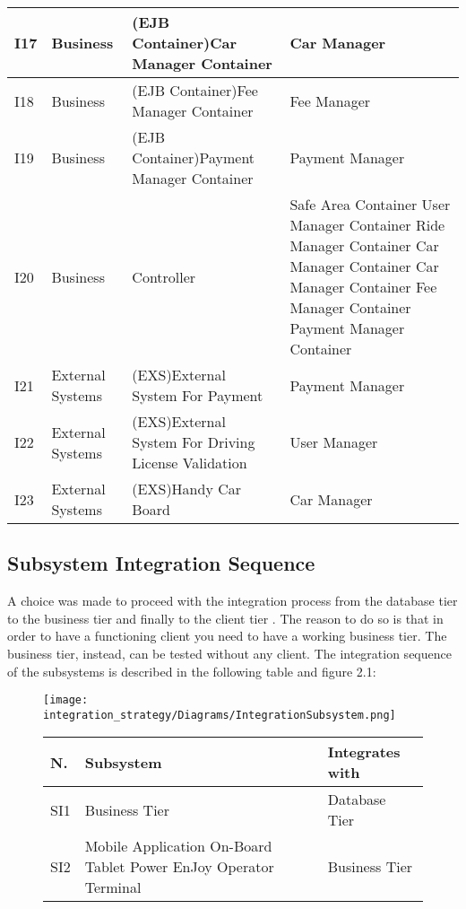 \begin{longtable}{| m{1cm}| m{} | m{4cm} | m{} | }
\hline
I17 & Business & (EJB Container)Car Manager Container & Car Manager\\
\hline
I18 & Business & (EJB Container)Fee Manager Container & Fee Manager\\
\hline
I19 & Business & (EJB Container)Payment Manager Container & Payment Manager\\
\hline
I20 & Business & Controller & Safe Area Container \newline User Manager Container \newline Ride Manager Container \newline Car Manager Container \newline Car Manager Container \newline Fee Manager Container \newline Payment Manager Container\\
\hline
I21 & External Systems & (EXS)External System For Payment & Payment Manager\\
\hline
I22 & External Systems & (EXS)External System For Driving License Validation & User Manager\\
\hline
I23 & External Systems & (EXS)Handy Car Board & Car Manager\\
\hline
\end{longtable}

\subsection{Subsystem Integration Sequence}
A choice was made to proceed with the integration process from the database tier to the business tier and finally to the client tier . The reason to do so is that in order to have a functioning client you need to have a working business tier. The business tier, instead, can be tested without any client. 
The integration sequence of the subsystems is described in the following table and figure 2.1:
\begin{figure}
	\centering
	\texttt{[image: integration\_strategy/Diagrams/IntegrationSubsystem.png]}
	\caption{Order of integration of the subsystems.}
	\label{fig:subsystems}
		
\begin{longtable}{| m{1cm}| m{4cm}| m{4cm} | }
\hline
\textbf{N.} & \textbf{Subsystem} & \textbf{Integrates with}\\
\hline
SI1 & Business Tier & Database Tier\\
\hline
SI2 & Mobile Application \newline On-Board Tablet \newline Power EnJoy Operator Terminal & Business Tier\\
\hline
\end{longtable}


\end{figure}

